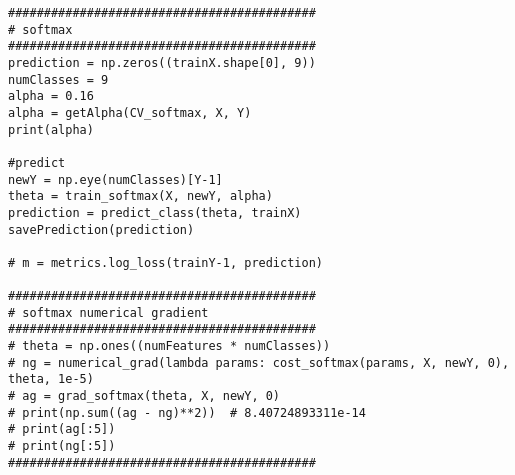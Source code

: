 \documentclass[a4paper,11pt]{article}
\begin{document}
\begin{lstlisting}
###########################################
# softmax
###########################################
prediction = np.zeros((trainX.shape[0], 9))
numClasses = 9
alpha = 0.16
alpha = getAlpha(CV_softmax, X, Y)
print(alpha)

#predict
newY = np.eye(numClasses)[Y-1]
theta = train_softmax(X, newY, alpha)
prediction = predict_class(theta, trainX)
savePrediction(prediction)

# m = metrics.log_loss(trainY-1, prediction)

###########################################
# softmax numerical gradient
###########################################
# theta = np.ones((numFeatures * numClasses))
# ng = numerical_grad(lambda params: cost_softmax(params, X, newY, 0), theta, 1e-5)
# ag = grad_softmax(theta, X, newY, 0)
# print(np.sum((ag - ng)**2))  # 8.40724893311e-14
# print(ag[:5])
# print(ng[:5])
###########################################

\end{lstlisting}
\end{document}
